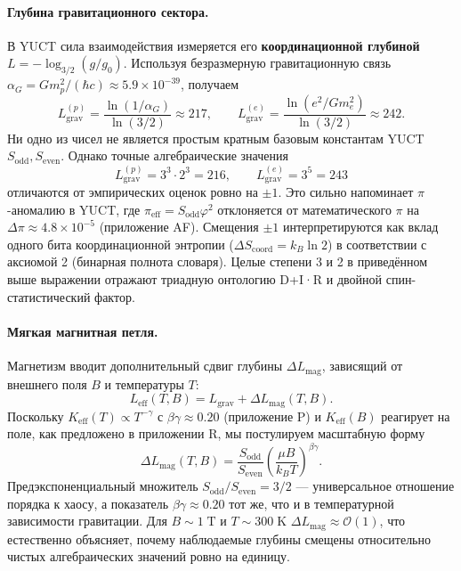 \documentclass[12pt]{article}
\theoremstyle{remark}
\begin{document}
	\paragraph{Глубина гравитационного сектора.}
	В YUCT сила взаимодействия измеряется его \textbf{координационной глубиной} $L = -\log_{3/2}(g/g_0)$. Используя безразмерную гравитационную связь $\alpha_G = G m_p^2/(\hbar c) \approx 5.9\times10^{-39}$, получаем
	\begin{equation}
		L_{\mathrm{grav}}^{(p)} = \frac{\ln(1/\alpha_G)}{\ln(3/2)} \approx 217,
		\qquad
		L_{\mathrm{grav}}^{(e)} = \frac{\ln(e^2/G m_e^2)}{\ln(3/2)} \approx 242.
	\end{equation}
	Ни одно из чисел не является простым кратным базовым константам YUCT $S_{\mathrm{odd}}, S_{\mathrm{even}}$. Однако точные алгебраические значения
	\begin{equation}
		\boxed{L_{\mathrm{grav}}^{(p)} = 3^3 \cdot 2^3 = 216},
		\qquad
		\boxed{L_{\mathrm{grav}}^{(e)} = 3^5 = 243}
	\end{equation}
	отличаются от эмпирических оценок ровно на $\pm1$.  
	Это сильно напоминает $\pi$-аномалию в YUCT, где $\pi_{\mathrm{eff}} = S_{\mathrm{odd}}\varphi^2$ отклоняется от математического $\pi$ на $\Delta\pi \approx 4.8\times10^{-5}$ (приложение AF).  
	Смещения $\pm1$ интерпретируются как вклад одного бита координационной энтропии ($\Delta S_{\mathrm{coord}} = k_B \ln 2$) в соответствии с аксиомой 2 (бинарная полнота словаря). Целые степени 3 и 2 в приведённом выше выражении отражают триадную онтологию D+I·R и двойной спин-статистический фактор.
	
	\paragraph{Мягкая магнитная петля.}
	Магнетизм вводит дополнительный сдвиг глубины $\Delta L_{\mathrm{mag}}$, зависящий от внешнего поля $B$ и температуры $T$:
	\begin{equation}
		L_{\mathrm{eff}}(T,B) = L_{\mathrm{grav}} + \Delta L_{\mathrm{mag}}(T,B).
	\end{equation}
	Поскольку $K_{\mathrm{eff}}(T) \propto T^{-\gamma}$ с $\beta\gamma \approx 0.20$ (приложение P) и $K_{\mathrm{eff}}(B)$ реагирует на поле, как предложено в приложении R, мы постулируем масштабную форму
	\begin{equation}
		\boxed{
			\Delta L_{\mathrm{mag}}(T,B) =
			\frac{S_{\mathrm{odd}}}{S_{\mathrm{even}}}
			\left( \frac{\mu B}{k_B T} \right)^{\beta\gamma}
		}.
		\label{eq:soft-loop}
	\end{equation}
	Предэкспоненциальный множитель $S_{\mathrm{odd}}/S_{\mathrm{even}} = 3/2$ — универсальное отношение порядка к хаосу, а показатель $\beta\gamma \approx 0.20$ тот же, что и в температурной зависимости гравитации. Для $B \sim 1\;\mathrm{T}$ и $T \sim 300\;\mathrm{K}$ $\Delta L_{\mathrm{mag}} \approx \mathcal{O}(1)$, что естественно объясняет, почему наблюдаемые глубины смещены относительно чистых алгебраических значений ровно на единицу.
	
\end{document}
